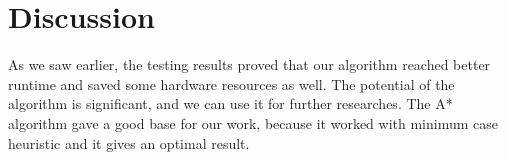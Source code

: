 \documentclass{article}
\begin{document}
\section{Discussion}
As we saw earlier, the testing results proved that our algorithm reached better runtime and saved some hardware resources as well. The potential of the algorithm is significant, and we can use it for further researches. The A* algorithm gave a good base for our work, because it worked with minimum case heuristic and it gives an optimal result.
\end{document}
